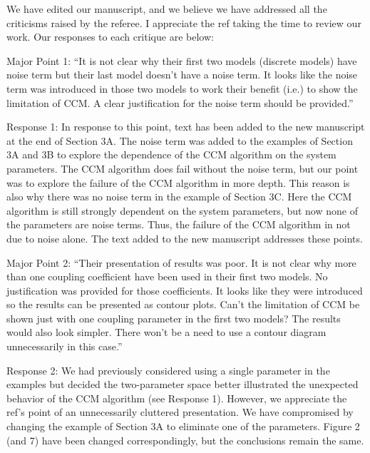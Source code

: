 \documentclass[]{article}
\title{}
\author{}
\begin{document}
\maketitle

We have edited our manuscript, and we believe we have addressed all the criticisms raised by the referee.  I appreciate the ref taking the time to review our work.  Our responses to each critique are below:

Major Point 1: ``It is not clear why their first two models (discrete models) have noise term but their last model doesn't have a noise term. It looks like the noise term was introduced in those two models to work their benefit (i.e.) to show the limitation of CCM. A clear justification for the noise term should be provided.''

Response 1: In response to this point, text has been added to the new manuscript at the end of Section 3A.  The noise term was added to the examples of Section 3A and 3B to explore the dependence of the CCM algorithm on the system parameters.  The CCM algorithm does fail without the noise term, but our point was to explore the failure of the CCM algorithm in more depth.  This reason is also why there was no noise term in the example of Section 3C.  Here the CCM algorithm is still strongly dependent on the system parameters, but now none of the parameters are noise terms.  Thus, the failure of the CCM algorithm in not due to noise alone.  The text added to the new manuscript addresses these points.

Major Point 2: ``Their presentation of results was poor. It is not clear why more than one coupling coefficient have been used in their first two models. No justification was provided for those coefficients. It looks like they were introduced so the results can be presented as contour plots.  Can't the limitation of CCM be shown just with one coupling parameter
in the first two models? The results would also look simpler. There won't be a need to use a contour diagram unnecessarily in this case.''

Response 2: We had previously considered using a single parameter in the examples but decided the two-parameter space better illustrated the unexpected behavior of the CCM algorithm (see Response 1).  However, we appreciate the ref's point of an unnecessarily cluttered presentation.  We have compromised by changing the example of Section 3A to eliminate one of the parameters.  Figure 2 (and 7) have been changed correspondingly, but the conclusions remain the same.
\end{document}
